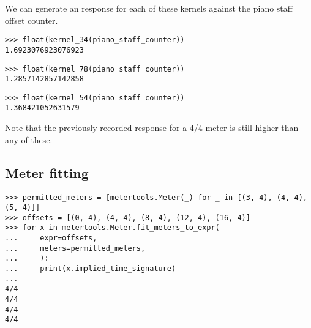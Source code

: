 \noindent We can generate an response for each of these kernels against the
piano staff offset counter.

\begin{comment}
<abjad>
float(kernel_34(piano_staff_counter))
float(kernel_78(piano_staff_counter))
float(kernel_54(piano_staff_counter))
</abjad>
\end{comment}

\begin{singlespacing}
\vspace{-0.5\baselineskip}
\begin{lstlisting}
>>> float(kernel_34(piano_staff_counter))
1.6923076923076923
\end{lstlisting}
\begin{lstlisting}
>>> float(kernel_78(piano_staff_counter))
1.2857142857142858
\end{lstlisting}
\begin{lstlisting}
>>> float(kernel_54(piano_staff_counter))
1.368421052631579
\end{lstlisting}
\end{singlespacing}

\noindent Note that the previously recorded response for a 4/4 meter is still
higher than any of these.

\subsection{Meter fitting} %

\begin{comment}
<abjad>
permitted_meters = [metertools.Meter(_) for _ in [(3, 4), (4, 4), (5, 4)]]
offsets = [(0, 4), (4, 4), (8, 4), (12, 4), (16, 4)]
for x in metertools.Meter.fit_meters_to_expr(
    expr=offsets,
    meters=permitted_meters,
    ):
    print(x.implied_time_signature)

</abjad>
\end{comment}

\begin{singlespacing}
\vspace{-0.5\baselineskip}
\begin{lstlisting}
>>> permitted_meters = [metertools.Meter(_) for _ in [(3, 4), (4, 4), (5, 4)]]
>>> offsets = [(0, 4), (4, 4), (8, 4), (12, 4), (16, 4)]
>>> for x in metertools.Meter.fit_meters_to_expr(
...     expr=offsets,
...     meters=permitted_meters,
...     ):
...     print(x.implied_time_signature)
...
4/4
4/4
4/4
4/4
\end{lstlisting}
\end{singlespacing}

